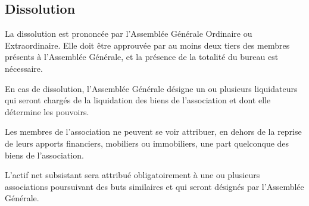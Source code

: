 \documentclass[a4paper,french,10pt]{article}
\newcommand{\article}[1]{\subsection{#1}\addtocounter{article}{1}}
\newcounter{article}
\begin{document}
\article{Dissolution}
\label{sec:dissolution}
La dissolution est prononcée par l'Assemblée Générale Ordinaire ou
Extraordinaire. Elle doit être approuvée par au moins deux tiers des
membres présents à l'Assemblée Générale, et la présence de la totalité
du bureau est nécessaire.

En cas de dissolution, l’Assemblée Générale désigne un ou plusieurs
liquidateurs qui seront chargés de la liquidation des biens de
l’association et dont elle détermine les pouvoirs.

Les membres de l’association ne peuvent se voir attribuer, en dehors
de la reprise de leurs apports financiers, mobiliers ou immobiliers,
une part quelconque des biens de l’association.

L’actif net subsistant sera attribué obligatoirement à une ou
plusieurs associations poursuivant des buts similaires et qui seront
désignés par l’Assemblée Générale.
\end{document}
